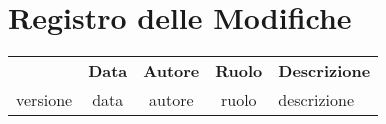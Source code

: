 \thispagestyle{empty}

\section*{Registro delle Modifiche}

\begin{center}
    \renewcommand{\arraystretch}{1.8}
    \begin{longtable}[c]{c | c | c | c | p{5cm}}
    \rowcolor[HTML]{444444}
    \multicolumn{1}{c}{\color[HTML]{FFFFFF} \textbf{Versione}} & 
    \multicolumn{1}{c}{\color[HTML]{FFFFFF} \textbf{Data}} & 
    \multicolumn{1}{c}{\color[HTML]{FFFFFF} \textbf{Autore}} & 
    \multicolumn{1}{c}{\color[HTML]{FFFFFF} \textbf{Ruolo}} & 
    \multicolumn{1}{c}{\color[HTML]{FFFFFF} \textbf{Descrizione}} \\

    
    versione & data & autore & ruolo & descrizione \\ \hline

    \end{longtable}
\end{center}